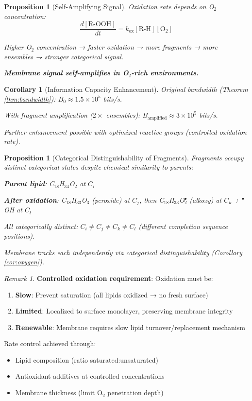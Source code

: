 \documentclass[11pt,a4paper]{article}
\newtheorem{proposition}[theorem]{Proposition}
\newtheorem{corollary}[theorem]{Corollary}
\theoremstyle{definition}
\theoremstyle{remark}
\newtheorem{remark}[theorem]{Remark}
\begin{document}
\begin{proposition}[Self-Amplifying Signal]
Oxidation rate depends on O$_2$ concentration:
\begin{equation}
\frac{d[\text{R-OOH}]}{dt} = k_{\text{ox}}[\text{R-H}][\text{O}_2]
\end{equation}

Higher O$_2$ concentration → faster oxidation → more fragments → more ensembles → stronger categorical signal.

\textbf{Membrane signal self-amplifies in O$_2$-rich environments.}
\end{proposition}

\begin{corollary}[Information Capacity Enhancement]
Original bandwidth (Theorem \ref{thm:bandwidth}): $B_0 \approx 1.5 \times 10^5$ bits/s.

With fragment amplification ($2\times$ ensembles): $B_{\text{amplified}} \approx 3 \times 10^5$ bits/s.

Further enhancement possible with optimized reactive groups (controlled oxidation rate).
\end{corollary}

\begin{proposition}[Categorical Distinguishability of Fragments]
Fragments occupy distinct categorical states despite chemical similarity to parents:

\textbf{Parent lipid}: C$_{18}$H$_{34}$O$_2$ at $C_i$

\textbf{After oxidation}: C$_{18}$H$_{33}$O$_3$ (peroxide) at $C_j$, then C$_{18}$H$_{33}$O$_2^\bullet$ (alkoxy) at $C_k$ + $^\bullet$OH at $C_l$

All categorically distinct: $C_i \neq C_j \neq C_k \neq C_l$ (different completion sequence positions).

Membrane tracks each independently via categorical distinguishability (Corollary \ref{cor:oxygen}).
\end{proposition}

\begin{remark}
\textbf{Controlled oxidation requirement}: Oxidation must be:
\begin{enumerate}
\item \textbf{Slow}: Prevent saturation (all lipids oxidized → no fresh surface)
\item \textbf{Limited}: Localized to surface monolayer, preserving membrane integrity
\item \textbf{Renewable}: Membrane requires slow lipid turnover/replacement mechanism
\end{enumerate}

Rate control achieved through:
\begin{itemize}
\item Lipid composition (ratio saturated:unsaturated)
\item Antioxidant additives at controlled concentrations
\item Membrane thickness (limit O$_2$ penetration depth)
\end{itemize}
\end{remark}
\end{document}
